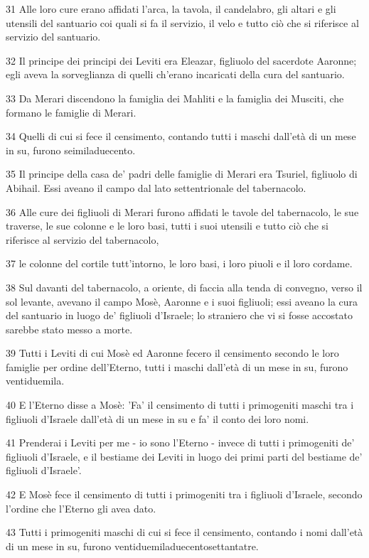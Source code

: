 \par 31 Alle loro cure erano affidati l'arca, la tavola, il candelabro, gli altari e gli utensili del santuario coi quali si fa il servizio, il velo e tutto ciò che si riferisce al servizio del santuario.
\par 32 Il principe dei principi dei Leviti era Eleazar, figliuolo del sacerdote Aaronne; egli aveva la sorveglianza di quelli ch'erano incaricati della cura del santuario.
\par 33 Da Merari discendono la famiglia dei Mahliti e la famiglia dei Musciti, che formano le famiglie di Merari.
\par 34 Quelli di cui si fece il censimento, contando tutti i maschi dall'età di un mese in su, furono seimiladuecento.
\par 35 Il principe della casa de' padri delle famiglie di Merari era Tsuriel, figliuolo di Abihail. Essi aveano il campo dal lato settentrionale del tabernacolo.
\par 36 Alle cure dei figliuoli di Merari furono affidati le tavole del tabernacolo, le sue traverse, le sue colonne e le loro basi, tutti i suoi utensili e tutto ciò che si riferisce al servizio del tabernacolo,
\par 37 le colonne del cortile tutt'intorno, le loro basi, i loro piuoli e il loro cordame.
\par 38 Sul davanti del tabernacolo, a oriente, di faccia alla tenda di convegno, verso il sol levante, avevano il campo Mosè, Aaronne e i suoi figliuoli; essi aveano la cura del santuario in luogo de' figliuoli d'Israele; lo straniero che vi si fosse accostato sarebbe stato messo a morte.
\par 39 Tutti i Leviti di cui Mosè ed Aaronne fecero il censimento secondo le loro famiglie per ordine dell'Eterno, tutti i maschi dall'età di un mese in su, furono ventiduemila.
\par 40 E l'Eterno disse a Mosè: 'Fa' il censimento di tutti i primogeniti maschi tra i figliuoli d'Israele dall'età di un mese in su e fa' il conto dei loro nomi.
\par 41 Prenderai i Leviti per me - io sono l'Eterno - invece di tutti i primogeniti de' figliuoli d'Israele, e il bestiame dei Leviti in luogo dei primi parti del bestiame de' figliuoli d'Israele'.
\par 42 E Mosè fece il censimento di tutti i primogeniti tra i figliuoli d'Israele, secondo l'ordine che l'Eterno gli avea dato.
\par 43 Tutti i primogeniti maschi di cui si fece il censimento, contando i nomi dall'età di un mese in su, furono ventiduemiladuecentosettantatre.
